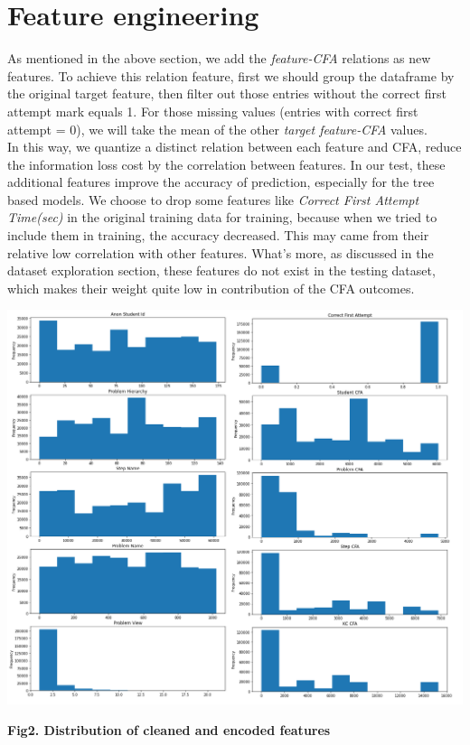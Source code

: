 \documentclass{article}
\begin{document}
\section{Feature engineering}
As mentioned in the above section, we add the \textit{feature-CFA} relations as new features. To achieve this relation feature, first we should group the dataframe by the original target feature, then filter out those entries without the correct first attempt mark equals 1. For those missing values (entries with correct first attempt = 0), we will take the mean of the other \textit{target feature-CFA} values.\\
In this way, we quantize a distinct relation between each feature and CFA, reduce the information loss cost by the correlation between features. In our test, these additional features improve the accuracy of prediction, especially for the tree based models. We choose to drop some features like \textit{Correct First Attempt Time(sec)} in the original training data for training, because when we tried to include them in training, the accuracy decreased. This may came from their relative low correlation with other features. What's more, as discussed in the dataset exploration section, these features do not exist in the testing dataset, which makes their weight quite low in contribution of the CFA outcomes.
\graphicspath{ {./images/} }
\includegraphics[scale=0.85]{distribution}
\begin{center} 
\centering
\textbf{Fig2. Distribution of cleaned and encoded features}\\
\end{center}
\end{document}
